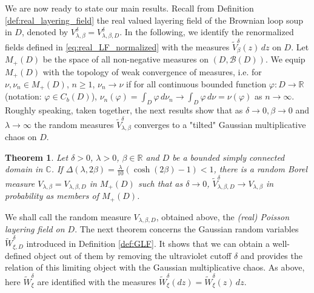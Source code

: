\documentclass[a4paper, 11pt, reqno]{amsart}
\theoremstyle{definition} \newtheorem{defn}{Definition}[section]
\theoremstyle{remark} \newtheorem{rem}[defn]{Remark}
\theoremstyle{remark} \newtheorem*{rem*}{Remark}
\theoremstyle{plain} \newtheorem{thm}[defn]{Theorem}
\theoremstyle{plain} \newtheorem{lem}[defn]{Lemma}
\theoremstyle{plain} \newtheorem{prop}[defn]{Proposition}
\theoremstyle{plain} \newtheorem{cor}[defn]{Corollary}
\theoremstyle{remark} \newtheorem{exm}[defn]{\textbf{Example}}
\theoremstyle{remark} \newtheorem{exms}[defn]{\textbf{Examples}}
\theoremstyle{remark} \newtheorem*{bl}{}
\numberwithin{equation}{section} %
\newcommand{\mc}{\mathcal}
\newcommand{\C}{\mathbb{C}}
\newcommand{\R}{\mathbb{R}}
\begin{document}
	We are now ready to state our main results. Recall from Definition \ref{def:real_layering_field} the real valued layering field of the Brownian loop soup in $D$, denoted by $V^{\delta}_{\lambda, \beta} = V^{\delta}_{\lambda, \beta, D}$. In the following, we identify the renormalized fields defined in \eqref{eq:real_LF_normalized} with the measures $\tilde{V}^{\delta}_{\beta}(z)\, dz$ on $D$. Let $M_+(D)$ be the space of all non-negative measures on $(D, \mc{B}(D))$.  We equip $M_+(D)$ with the topology of weak convergence of measures, i.e. for $\nu, \nu_n \in M_+(D)$, $n \ge 1$, $\nu_n \to \nu$ if for all continuous bounded function $\varphi: D \to \R$ (notation: $\varphi\in C_b(D)$), $\nu_n(\varphi) = \int_D \varphi \, d\nu_n \to \int_D \varphi \, d\nu = \nu(\varphi)$ as $n \to \infty$. Roughly speaking, taken together, the next results show that as $\delta \to 0, \beta \to 0$ and $\lambda \to \infty$ the random measures $\tilde{V}^{\delta}_{\lambda, \beta}$ converges to a "tilted" Gaussian multiplicative chaos on $D$. 
	
	\begin{thm}\label{thm:main_1}
		Let $\delta>0$, $\lambda >0$, $\beta \in \R$ and $D$ be a bounded simply connected domain in $\C$. If $\Delta(\lambda, 2\beta) = \frac{\lambda}{10}(\cosh (2\beta)-1)< 1$, there is a random Borel measure $V_{\lambda, \beta} =V_{\lambda, \beta, D}$ in $M_+(D)$ such that as $\delta \to 0$, $\tilde{V}^{\delta}_{\lambda, \beta, D} \to V_{\lambda, \beta}$ in probability as members of $M_+(D)$.   
	\end{thm}

    We shall call the random measure $V_{\lambda, \beta, D}$, obtained above, the \textit{(real) Poisson layering field on $D$}. The next theorem concerns the Gaussian random variables $\tilde{W}^{\delta}_{\xi, D}$ introduced in Definition 
    \ref{def:GLF}. It shows that we can obtain a well-defined object out of them by removing the ultraviolet cutoff $\delta$ and provides the relation of this limiting object with the Gaussian multiplicative chaos. As above, here $\tilde{W}^{\delta}_{\xi}$ are identified with the measures $\tilde{W}^{\delta}_{\xi}(dz) = \tilde{W}^{\delta}_{\xi}(z) \, dz$.
 
\end{document}
